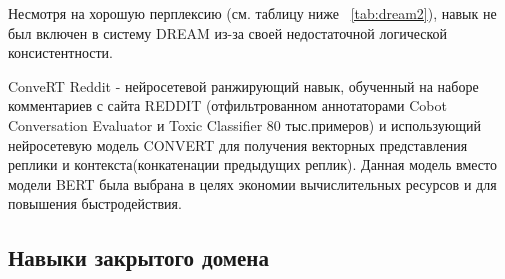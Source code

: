 Несмотря на хорошую перплексию (см. таблицу ниже ~\ref{tab:dream2}), навык не был включен в систему {DREAM} из-за своей недостаточной логической консистентности.


\begin{table}[htbp]
\centering
\caption {Точность (перплексия) для генеративного навыка}
\label{tab:dream2}%
\end{table}



ConveRT Reddit - нейросетевой ранжирующий навык, обученный на наборе комментариев с сайта REDDIT \cite{na_website_ndu} (отфильтрованном аннотаторами Cobot Conversation Evaluator и Toxic Classifier 80 тыс.примеров) и использующий нейросетевую модель CONVERT \cite{henderson_2019} для получения векторных представления реплики и контекста(конкатенации предыдущих реплик). Данная модель вместо модели BERT была выбрана в целях экономии вычислительных ресурсов и для повышения быстродействия.

\subsection{Навыки закрытого домена}\label{dream:1:closed}

